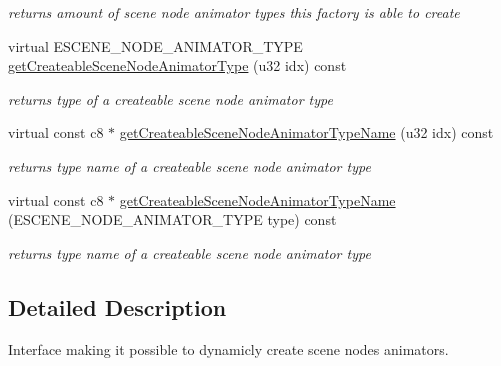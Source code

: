 \begin{DoxyCompactItemize}
\begin{DoxyCompactList}\small\item\em returns amount of scene node animator types this factory is able to create \end{DoxyCompactList}\item 
virtual E\-S\-C\-E\-N\-E\-\_\-\-N\-O\-D\-E\-\_\-\-A\-N\-I\-M\-A\-T\-O\-R\-\_\-\-T\-Y\-P\-E \hyperlink{classirr_1_1scene_1_1_c_default_scene_node_animator_factory_ab88873d84f49f44d08be9b5560dbe9ce}{get\-Createable\-Scene\-Node\-Animator\-Type} (u32 idx) const 
\begin{DoxyCompactList}\small\item\em returns type of a createable scene node animator type \end{DoxyCompactList}\item 
virtual const c8 $\ast$ \hyperlink{classirr_1_1scene_1_1_c_default_scene_node_animator_factory_a7ee3202458abed35df7d6afb72ce0dc1}{get\-Createable\-Scene\-Node\-Animator\-Type\-Name} (u32 idx) const 
\begin{DoxyCompactList}\small\item\em returns type name of a createable scene node animator type \end{DoxyCompactList}\item 
virtual const c8 $\ast$ \hyperlink{classirr_1_1scene_1_1_c_default_scene_node_animator_factory_a6b6ddf89b502e4c425c1f17da82158e2}{get\-Createable\-Scene\-Node\-Animator\-Type\-Name} (E\-S\-C\-E\-N\-E\-\_\-\-N\-O\-D\-E\-\_\-\-A\-N\-I\-M\-A\-T\-O\-R\-\_\-\-T\-Y\-P\-E type) const 
\begin{DoxyCompactList}\small\item\em returns type name of a createable scene node animator type \end{DoxyCompactList}\end{DoxyCompactItemize}


\subsection{Detailed Description}
Interface making it possible to dynamicly create scene nodes animators. 

